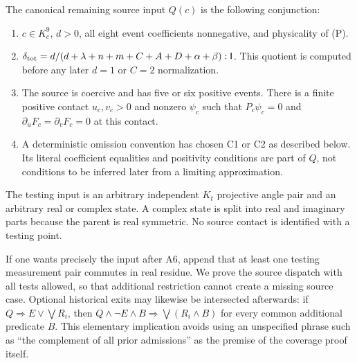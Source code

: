 \documentclass[11pt]{article}
\newcommand{\I}{\mathsf I}
\begin{document}
The canonical remaining source input $Q(c)$ is the following conjunction:
\begin{enumerate}
\item $c\in K_c^9$, $d>0$, all eight event coefficients nonnegative,
and physicality of (P).
\item $\delta_{\rm tot}=d/(d+\lambda+n+m+C+A+D+\alpha+\beta):\I$.
This quotient is computed before any later $d=1$ or $C=2$ normalization.
\item The source is coercive and has five or six positive events.
There is a finite positive contact $u_c,v_c>0$ and nonzero $\psi_c$
such that $P_c\psi_c=0$ and
$\partial_u F_c=\partial_v F_c=0$ at this contact.
\item A deterministic omission convention has chosen C1 or C2 as
described below. Its literal coefficient equalities and positivity
conditions are part of $Q$, not conditions to be inferred later from
a limiting approximation.
\end{enumerate}
The testing input is an arbitrary independent $K_t$ projective angle
pair and an arbitrary real or complex state. A complex state is split
into real and imaginary parts because the parent is real symmetric.
No source contact is identified with a testing point.

If one wants precisely the input after A6, append that at least one
testing measurement pair commutes in real residue. We prove the source
dispatch with all tests allowed, so that additional restriction cannot
create a missing source case. Optional historical exits may likewise be
intersected afterwards: if $Q\Rightarrow E\lor\bigvee R_i$, then
$Q\land\neg E\land B\Rightarrow\bigvee(R_i\land B)$ for every
common additional predicate $B$. This elementary implication avoids
using an unspecified phrase such as ``the complement of all prior
admissions'' as the premise of the coverage proof itself.
\end{document}
